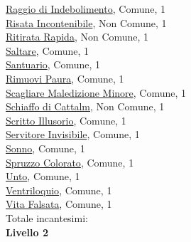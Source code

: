 \begin{multicols}{3}
{{\hyperlink{Raggio di Indebolimento}{Raggio di Indebolimento}, Comune, 1\\
\hyperlink{Risata Incontenibile}{Risata Incontenibile}, Non Comune, 1\\
\hyperlink{Ritirata Rapida}{Ritirata Rapida}, Non Comune, 1\\
\hyperlink{Saltare}{Saltare}, Comune, 1\\
\hyperlink{Santuario}{Santuario}, Comune, 1\\
\hyperlink{Rimuovi Paura}{Rimuovi Paura}, Comune, 1 \\
\hyperlink{Scagliare Maledizione Minore}{Scagliare Maledizione Minore}, Comune, 1\\
\hyperlink{Schiaffo di Cattalm}{Schiaffo di Cattalm}, Non Comune, 1\\
\hyperlink{Scritto Illusorio}{Scritto Illusorio}, Comune, 1\\
\hyperlink{Servitore Invisibile}{Servitore Invisibile}, Comune, 1\\
\hyperlink{Sonno}{Sonno}, Comune, 1\\
\hyperlink{Spruzzo Colorato}{Spruzzo Colorato}, Comune, 1\\
\hyperlink{Unto}{Unto}, Comune, 1\\
\hyperlink{Ventriloquio}{Ventriloquio}, Comune, 1\\
\hyperlink{Vita Falsata}{Vita Falsata}, Comune, 1\\


\medskip Totale incantesimi: \theinclvuno\\

\textbf{Livello 2} 

}}
\end{multicols}
